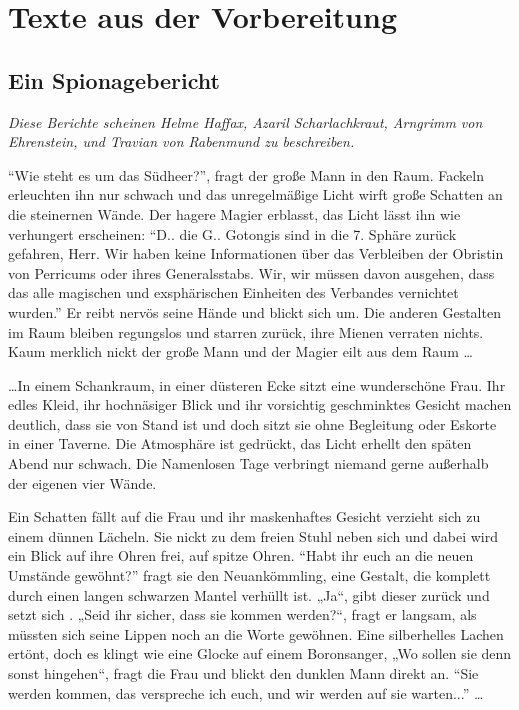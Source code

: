 \chapter{Texte aus der Vorbereitung}

\section{Ein Spionagebericht}
{\itshape
Diese Berichte scheinen Helme Haffax, Azaril Scharlachkraut, Arngrimm von Ehrenstein, und Travian von Rabenmund zu beschreiben.
}

``Wie steht es um das Südheer?'', fragt der große Mann in den Raum. Fackeln erleuchten ihn nur schwach und das unregelmäßige Licht wirft große Schatten an die steinernen Wände. Der hagere Magier erblasst, das Licht lässt ihn wie verhungert erscheinen: “D.. die G.. Gotongis sind in die 7. Sphäre zurück gefahren, Herr. Wir haben keine Informationen über das Verbleiben der Obristin von Perricums oder ihres Generalsstabs. Wir, wir müssen davon ausgehen, dass das alle magischen und exsphärischen Einheiten des Verbandes vernichtet wurden.” Er reibt nervös seine Hände und blickt sich um. Die anderen Gestalten im Raum bleiben regungslos und starren zurück, ihre Mienen verraten nichts. Kaum merklich nickt der große Mann und der Magier eilt aus dem Raum \dots

\dots In einem Schankraum, in einer düsteren Ecke sitzt eine wunderschöne Frau. Ihr edles Kleid, ihr hochnäsiger Blick und ihr vorsichtig geschminktes Gesicht machen deutlich, dass sie von Stand ist und doch sitzt sie ohne Begleitung oder Eskorte in einer Taverne. Die Atmosphäre ist gedrückt, das Licht erhellt den späten Abend nur schwach. Die Namenlosen Tage verbringt niemand gerne außerhalb der eigenen vier Wände.

Ein Schatten fällt auf die Frau und ihr maskenhaftes Gesicht verzieht sich zu einem dünnen Lächeln. Sie nickt zu dem freien Stuhl neben sich und dabei wird ein Blick auf ihre Ohren frei, auf spitze Ohren. “Habt ihr euch an die neuen Umstände gewöhnt?” fragt sie den Neuankömmling, eine Gestalt, die komplett durch einen langen schwarzen Mantel verhüllt ist. „Ja“, gibt dieser zurück und setzt sich . „Seid ihr sicher, dass sie kommen werden?“, fragt er langsam, als müssten sich seine Lippen noch an die Worte gewöhnen. Eine silberhelles Lachen ertönt, doch es klingt wie eine Glocke auf einem Boronsanger, „Wo sollen sie denn sonst hingehen“, fragt die Frau und blickt den dunklen Mann direkt an. ``Sie werden kommen, das verspreche ich euch, und wir werden auf sie warten...'' \dots

